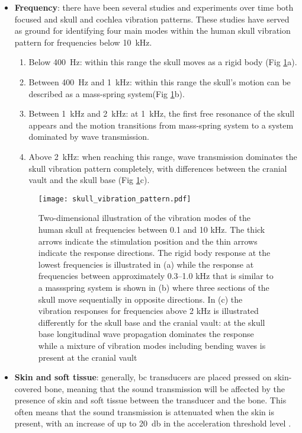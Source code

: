 \begin{itemize}
\item \textbf{Frequency}: there have been several studies and experiments over time both focused and skull and cochlea vibration patterns. These studies have served as ground for identifying four main modes within the human skull vibration pattern for frequencies below \SI{10}{\kilo\hertz}.
\begin{enumerate}
\item Below \SI{400}{\hertz}: within this range the skull moves as a rigid body (Fig \ref{fig:skull_vibration_pattern}a).\citep{stenfelt_2005b}
\item Between \SI{400}{\hertz} and \SI{1}{\kilo\hertz}: within this range the skull's motion can be described as a mass-spring system(Fig \ref{fig:skull_vibration_pattern}b).
\item Between \SI{1}{\kilo\hertz} and \SI{2}{\kilo\hertz}: at \SI{1}{\kilo\hertz}, the first free resonance of the skull appears \citep{hakansson_1994} and the motion transitions from mass-spring system to a system dominated by wave transmission.
\item Above \SI{2}{\kilo\hertz}: when reaching this range, wave transmission dominates the skull vibration pattern completely, with differences between the cranial vault and the skull base (Fig \ref{fig:skull_vibration_pattern}c).
\end{enumerate}
\begin{figure}[H]
	\centering
		\texttt{[image: skull\_vibration\_pattern.pdf]}
		\caption{Two-dimensional illustration of the vibration modes of the human skull at frequencies between 0.1 and 10 kHz. The thick arrows indicate the stimulation position and the thin arrows indicate the response directions. The rigid body response at the lowest frequencies is illustrated in (a) while the response at frequencies between approximately 0.3–1.0 kHz that is similar to a massspring system is shown in (b) where three sections of the skull move sequentially in opposite directions. In (c) the vibration responses for frequencies above 2 kHz is illustrated differently for the skull base and the cranial vault: at the skull base longitudinal wave propagation dominates the response while a mixture of vibration modes including bending waves is present at the cranial vault \citep{puria_2013}}
		\label{fig:skull_vibration_pattern}
\end{figure}
\item \textbf{Skin and soft tissue}: generally, \gls{bc} transducers are placed pressed on skin-covered bone, meaning that the sound transmission will be affected by the presence of skin and soft tissue between the transducer and the bone. This often means that the sound transmission is attenuated when the skin is present, with an increase of up to \SI{20}{\decibel} in the acceleration threshold level \citep{hakansson_1985}.

\end{itemize}
